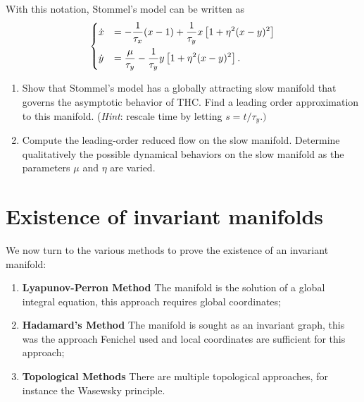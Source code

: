 \begin{exercise}
With this notation, Stommel's model can be written as
\begin{align}
\begin{dcases}
\dot{x} &=-\frac{1}{\tau_{x}}(x-1)+\frac{1}{\tau_{y}}x\left[1+\eta^{2}(x-y)^{2}\right]\\
\dot{y} &=\frac{\mu}{\tau_{y}}-\frac{1}{\tau_{y}}y\left[1+\eta^{2}(x-y)^{2}\right].
\end{dcases}
\end{align}

\begin{enumerate}
\item Show that Stommel's model has a globally attracting slow manifold
that governs the asymptotic behavior of THC. Find a leading order
approximation to this manifold. (\emph{Hint}: rescale time by letting
$s=t/\tau_{y}.)$
\item Compute the leading-order reduced flow on the slow manifold. Determine
qualitatively the possible dynamical behaviors on the slow manifold
as the parameters $\mu$ and $\eta$ are varied.
\end{enumerate}
\end{exercise}

\section{Existence of invariant manifolds}
We now turn to the various methods to prove the existence of an invariant manifold:
\begin{enumerate}
	\item \textbf{Lyapunov-Perron Method} The manifold is the solution of a global integral equation, this approach requires global coordinates;
	\item \textbf{Hadamard's Method} The manifold is sought as an invariant graph, this was the approach Fenichel used and local coordinates are sufficient for this approach;
	\item \textbf{Topological Methods} There are multiple topological approaches, for instance the Wasewsky principle.
\end{enumerate}


